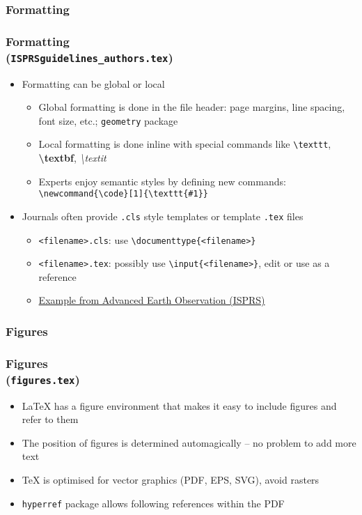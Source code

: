 \documentclass[xetex,colorlinks]{beamer} %
\begin{document}
  \subsubsection{Formatting}
  \begin{frame}
    \frametitle{Formatting \\ (\texttt{ISPRSguidelines\_authors.tex})}
    \begin{itemize}
     \item Formatting can be global or local
     \begin{itemize}
      \item Global formatting is done in the file header: page margins, line spacing, font size, etc.; \texttt{geometry} package
      \item Local formatting is done inline with special commands like \texttt{\textbackslash{}texttt}, \textbf{\textbackslash{}textbf}, \textit{\textbackslash{}textit}
      \item Experts enjoy semantic styles by defining new commands: \texttt{\textbackslash{}newcommand\{\textbackslash{}code\}[1]\{\textbackslash{}texttt\{\#1\}\}}
     \end{itemize}
     \item Journals often provide \texttt{.cls} style templates or template \texttt{.tex} files
     \begin{itemize}
      \item \texttt{<filename>.cls}: use \texttt{\textbackslash{}documenttype\{<filename>\}}
      \item \texttt{<filename>.tex}: possibly use \texttt{\textbackslash{}input\{<filename>\}}, edit or use as a reference
      \item \href{http://www.isprs.org/documents/orangebook/app5.aspx}{Example from Advanced Earth Observation (ISPRS)}
     \end{itemize}
    \end{itemize}
  \end{frame}
  
  \subsubsection{Figures}
  \begin{frame}
    \frametitle{Figures \\ (\texttt{figures.tex})}
    \begin{itemize}
     \item \LaTeX{} has a figure environment that makes it easy to include figures and refer to them
     \item The position of figures is determined automagically – no problem to add more text
     \item \TeX{} is optimised for vector graphics (PDF, EPS, SVG), avoid rasters
     \item \texttt{hyperref} package allows following references within the PDF
    \end{itemize}
  \end{frame}
  
\end{document}
